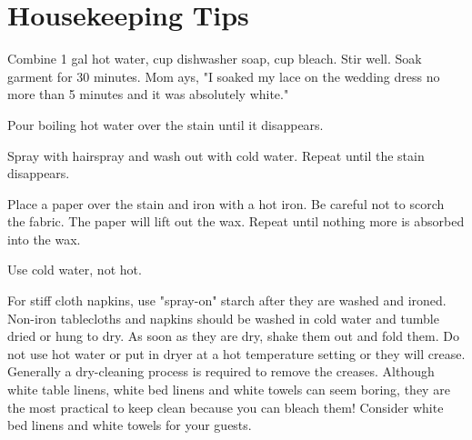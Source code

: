 \chapter*{Housekeeping Tips}

 \par
\begin{minipage}{\linewidth}
Combine 1 gal hot water,  cup dishwasher soap,  cup bleach. Stir well. Soak garment for 30 minutes.  Mom ays, "I soaked my lace on the wedding dress no more than 5 minutes and it was absolutely white."
\end{minipage}\par

\begin{minipage}{\linewidth}
Pour boiling hot water over the stain until it disappears.
\end{minipage}\par

\begin{minipage}{\linewidth}
Spray with hairspray and wash out with cold water. Repeat until the stain disappears.
\end{minipage}\par

\begin{minipage}{\linewidth}
Place a paper over the stain and iron with a hot iron. Be careful not to scorch the fabric. The paper will lift out the wax. Repeat until nothing more is absorbed into the wax.
\end{minipage}\par

\begin{minipage}{\linewidth}
Use cold water, not hot.
\end{minipage}\par

\begin{minipage}{\linewidth}
For stiff cloth napkins, use "spray-on" starch after they are washed and ironed.
Non-iron tablecloths and napkins should be washed in cold water and tumble dried or hung to dry. As soon as they are dry, shake them out and fold them. Do not use hot water or put in dryer at a hot temperature setting or they will crease. Generally a dry-cleaning process is required to remove the creases.
Although white table linens, white bed linens and white towels can seem boring, they are the most practical to keep clean because you can bleach them! Consider white bed linens and white towels for your guests.
\end{minipage}\par

